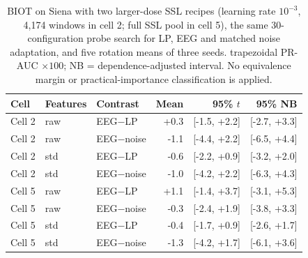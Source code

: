 \begin{table}[!htbp]
\caption{BIOT on Siena with two larger-dose SSL recipes (learning rate $10^{-3}$, 4,174 windows in cell 2; full SSL pool in cell 5), the same 30-configuration probe search for LP, EEG and matched noise adaptation, and five rotation means of three seeds. trapezoidal PR-AUC $\times100$; NB = dependence-adjusted interval. No equivalence margin or practical-importance classification is applied.}
\label{tab:d32-pr_auc_trapz}
\centering\footnotesize
\setlength{\tabcolsep}{3pt}
\begin{tabular}{lllrrr}
\toprule
Cell & Features & Contrast & Mean & 95\% $t$ & 95\% NB\\
\midrule
Cell 2 & raw & EEG$-$LP & +0.3 & [-1.5, +2.2] & [-2.7, +3.3]\\
Cell 2 & raw & EEG$-$noise & -1.1 & [-4.4, +2.2] & [-6.5, +4.4]\\
Cell 2 & std & EEG$-$LP & -0.6 & [-2.2, +0.9] & [-3.2, +2.0]\\
Cell 2 & std & EEG$-$noise & -1.0 & [-4.2, +2.2] & [-6.3, +4.3]\\
Cell 5 & raw & EEG$-$LP & +1.1 & [-1.4, +3.7] & [-3.1, +5.3]\\
Cell 5 & raw & EEG$-$noise & -0.3 & [-2.4, +1.9] & [-3.8, +3.3]\\
Cell 5 & std & EEG$-$LP & -0.4 & [-1.7, +0.9] & [-2.6, +1.7]\\
Cell 5 & std & EEG$-$noise & -1.3 & [-4.2, +1.7] & [-6.1, +3.6]\\
\bottomrule
\end{tabular}
\end{table}
